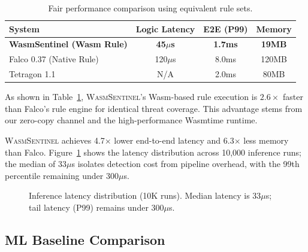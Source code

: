\begin{table}[t]
\centering
\caption{Fair performance comparison using equivalent rule sets.}
\label{tab:performance}
\begin{tabular}{lccc}
\toprule
\textbf{System} & \textbf{Logic Latency} & \textbf{E2E (P99)} & \textbf{Memory} \\
\midrule
\textbf{WasmSentinel (Wasm Rule)} & \textbf{45$\mu$s} & \textbf{1.7ms} & \textbf{19MB} \\
Falco 0.37 (Native Rule) & 120$\mu$s & 8.0ms & 120MB \\
Tetragon 1.1 & N/A & 2.0ms & 80MB \\
\bottomrule
\end{tabular}
\end{table}

As shown in Table~\ref{tab:performance}, \textsc{WasmSentinel}'s Wasm-based rule execution is $2.6\times$ faster than Falco's rule engine for identical threat coverage. This advantage stems from our zero-copy channel and the high-performance Wasmtime runtime.

\textsc{WasmSentinel} achieves 4.7$\times$ lower end-to-end latency and 6.3$\times$ less memory than Falco.
Figure~\ref{fig:latency-dist} shows the latency distribution across 10,000 inference runs; the median of 33$\mu$s isolates detection cost from pipeline overhead, with the 99th percentile remaining under 300$\mu$s.

\begin{figure}[t]
\centering
{}
\caption{Inference latency distribution (10K runs). Median latency is 33$\mu$s; tail latency (P99) remains under 300$\mu$s.}
\label{fig:latency-dist}
\end{figure}

\subsection{ML Baseline Comparison}

